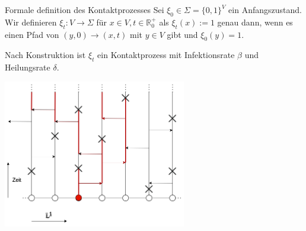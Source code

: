 \documentclass[11pt]{beamer}
\begin{document}
\begin{frame}{Formale definition des Kontaktprozesses}
    Sei $\xi_0 \in \Sigma = \{0, 1\}^V$ ein Anfangszustand. Wir definieren $\xi_t: V \to \Sigma$ für
    $x \in V, t \in \mathbb{R}^+_0$ als $\xi_t(x) := 1$ genau dann, wenn es
    einen Pfad von $(y, 0) \to (x, t)$ mit $y \in V$ gibt und $\xi_0(y) = 1$.
    \begin{block}{}
        Nach Konstruktion ist $\xi_t$ ein Kontaktprozess mit Infektionsrate $\beta$ und Heilungsrate $\delta$.
    \end{block}
    \begin{center}
        \includegraphics[width=0.6\textwidth]{images/contact process process.png}
    \end{center}
\end{frame}
\end{document}
